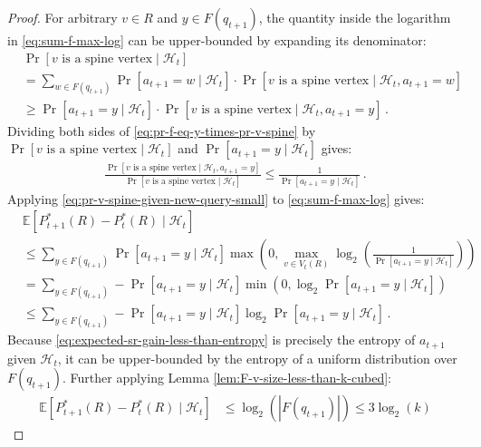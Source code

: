 \documentclass[11pt]{article}
\begin{document}
\begin{proof}
For arbitrary $v \in R$ and $y \in F(q_{t+1})$, the quantity inside the logarithm in \eqref{eq:sum-f-max-log} can be upper-bounded by expanding its denominator:
\begin{align}
    &\Pr [\text{$v$ is a spine vertex} \mid \mathcal{H}_t] \\
    &= \sum_{w \in F(q_{t+1})} \Pr \left[a_{t+1} = w \mid \mathcal{H}_t\right] \cdot \Pr [\text{$v$ is a spine vertex} \mid \mathcal{H}_t, a_{t+1} = w] \\
    &\geq \Pr \left[a_{t+1} = y \mid \mathcal{H}_t\right] \cdot \Pr [\text{$v$ is a spine vertex} \mid \mathcal{H}_t, a_{t+1} = y] \,. \label{eq:pr-f-eq-y-times-pr-v-spine}
\end{align}
Dividing both sides of \eqref{eq:pr-f-eq-y-times-pr-v-spine} by $\Pr [\text{$v$ is a spine vertex} \mid \mathcal{H}_t]$ and $\Pr \left[a_{t+1} = y \mid \mathcal{H}_t\right]$ gives:
\begin{align}
    \frac{\Pr [\text{$v$ is a spine vertex} \mid \mathcal{H}_t, a_{t+1} = y]}{\Pr [\text{$v$ is a spine vertex} \mid \mathcal{H}_t]} \leq \frac{1}{\Pr \left[a_{t+1} = y \mid \mathcal{H}_t\right]} \,. \label{eq:pr-v-spine-given-new-query-small}
\end{align}
Applying \eqref{eq:pr-v-spine-given-new-query-small} to \eqref{eq:sum-f-max-log} gives:
\begin{align}
    &\mathbb{E}[P^*_{t+1}(R) - P^*_t(R) \mid \mathcal{H}_t] \\
    &\leq \sum_{y \in F(q_{t+1})} \Pr \left[a_{t+1} = y \mid \mathcal{H}_t\right] \max \left(0, \max_{v \in V_t(R)} \log_2 \left(\frac{1}{\Pr \left[a_{t+1} = y \mid \mathcal{H}_t\right]}\right)\right) \\
    &= \sum_{y \in F(q_{t+1})} - \Pr \left[a_{t+1} = y \mid \mathcal{H}_t\right] \min \left(0, \log_2 \Pr \left[a_{t+1} = y \mid \mathcal{H}_t\right]\right) \\
    &\leq \sum_{y \in F(q_{t+1})} - \Pr \left[a_{t+1} = y \mid \mathcal{H}_t\right] \log_2 \Pr \left[a_{t+1} = y \mid \mathcal{H}_t\right] \,. \label{eq:expected-sr-gain-less-than-entropy}
\end{align}
Because \eqref{eq:expected-sr-gain-less-than-entropy} is precisely the entropy of $a_{t+1}$ given $\mathcal{H}_t$, it can be upper-bounded by the entropy of a uniform distribution over $F(q_{t+1})$. Further applying Lemma \ref{lem:F-v-size-less-than-k-cubed}:
\begin{align}
    \mathbb{E}[P^*_{t+1}(R) - P^*_t(R) \mid \mathcal{H}_t] &\leq \log_2(|F(q_{t+1})|) \leq 3\log_2(k) \label{eq:Pt-change-given-history-small}
\end{align}


\end{proof}
\end{document}
